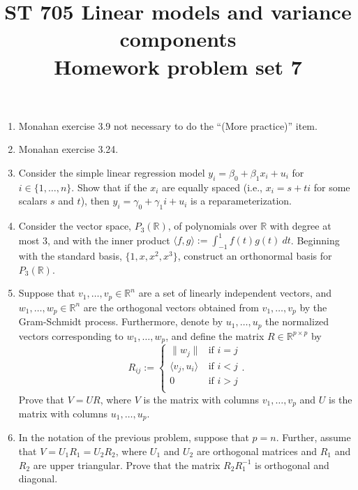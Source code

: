 \documentclass[11pt]{article}
\title{ST 705 Linear models and variance components \\ 
        Homework problem set 7}
\begin{document}
\maketitle

\begin{enumerate}

\item Monahan exercise 3.9 not necessary to do the ``(More practice)'' item.

\item Monahan exercise 3.24.

\item Consider the simple linear regression model $y_{i} = \beta_{0} + \beta_{1}x_{i} + u_{i}$ for $i \in \{1,\dots,n\}$.  Show that if the $x_{i}$ are equally spaced (i.e., $x_{i} = s + ti$ for some scalars $s$ and $t$), then $y_{i} = \gamma_{0} + \gamma_{1}i + u_{i}$ is a reparameterization.

\item Consider the vector space, $P_{3}(\mathbb{R})$, of polynomials over $\mathbb{R}$ with degree at most 3, and with the inner product $\langle f, g\rangle := \int_{-1}^{1}f(t)g(t) \ dt$.  Beginning with the standard basis, $\{1, x, x^{2}, x^{3}\}$, construct an orthonormal basis for $P_{3}(\mathbb{R})$.

\item Suppose that $v_{1},\dots,v_{p} \in \mathbb{R}^{n}$ are a set of linearly independent vectors, and $w_{1},\dots,w_{p} \in \mathbb{R}^{n}$ are the orthogonal vectors obtained from $v_{1},\dots,v_{p}$ by the Gram-Schmidt process.  Furthermore, denote by $u_{1},\dots,u_{p}$ the normalized vectors corresponding to $w_{1},\dots,w_{p}$, and define the matrix $R \in \mathbb{R}^{p\times p}$ by
\[
R_{ij} :=
\begin{cases}
\|w_{j}\| & \text{if } i=j \\
\langle v_{j}, u_i\rangle & \text{if } i<j \\
0 & \text{if } i>j \\
\end{cases}.
\]
Prove that $V = UR$, where $V$ is the matrix with columns $v_{1},\dots,v_{p}$ and $U$ is the matrix with columns $u_{1},\dots,u_{p}$.

\item In the notation of the previous problem, suppose that $p = n$.  Further, assume that $V = U_{1}R_{1} = U_{2}R_{2}$, where $U_{1}$ and $U_{2}$ are orthogonal matrices and $R_{1}$ and $R_{2}$ are upper triangular.  Prove that the matrix $R_{2}R_{1}^{-1}$ is orthogonal and diagonal.

\end{enumerate}
\end{document}
